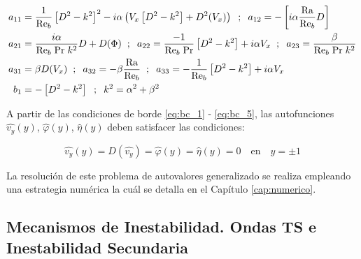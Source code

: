 \begin{align*}
a_{11} &= \frac{1}{\text{Re}_b} \left[ D^2 - k^2 \right]^2 - i \alpha \left( V_x \left[ D^2 - k^2 \right] + D^2(V_x)\right) \hspace{2mm} ; \hspace{2mm} a_{12} = -\left[ i \alpha \frac{\text{Ra}}{\text{Re}_b} D \right] \\
a_{21} &= \frac{i \alpha}{\text{Re}_b \hspace{1mm} \text{Pr} \hspace{1mm} k^2} D + D(\Phi) \hspace{2mm} ; \hspace{2mm} a_{22} = \frac{-1}{\text{Re}_b \hspace{1mm} \text{Pr} } \left[ D^2 - k^2 \right] + i \alpha V_x  \hspace{2mm} ; \hspace{2mm} a_{23} = \frac{\beta}{\text{Re}_b \hspace{1mm} \text{Pr} \hspace{1mm} k^2} \\
a_{31} &= \beta D(V_x) \hspace{2mm} ; \hspace{2mm} a_{32} = - \beta \frac{\text{Ra}}{\text{Re}_b}  \hspace{2mm} ; \hspace{2mm} a_{33} = -\frac{1}{\text{Re}_b} \left[ D^2 - k^2 \right] + i \alpha V_x \\
b_1    &= - \left[ D^2 - k^2 \right] \hspace{2mm} ; \hspace{2mm} k^2 = \alpha^2 + \beta^2 \\
\end{align*}

A partir de las condiciones de borde \ref{eq:bc_1} - \ref{eq:bc_5}, las autofunciones $\widehat{v_y}(y)$, $\widehat{\varphi}(y)$, $\widehat{\eta}(y)$ deben satisfacer las condiciones:

\begin{equation}
\widehat{v_y}(y) = D(\widehat{v_y}) = \widehat{\varphi}(y) = \widehat{\eta}(y) = 0 \quad \text{en} \quad y= \pm 1
\end{equation} 

La resolución de este problema de autovalores generalizado se realiza empleando una estrategia numérica la cuál se detalla en el Capítulo \ref{cap:numerico}. 

\subsection{Mecanismos de Inestabilidad. Ondas TS e Inestabilidad Secundaria }

